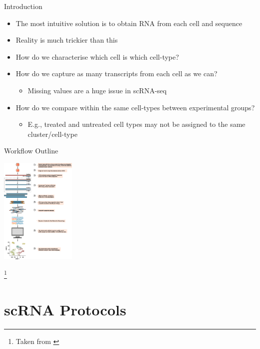 \documentclass[aspectratio=169,11pt]{beamer}
\newcommand\blfootnote[1]{%
  \begingroup
  \renewcommand\thefootnote{}\footnote{#1}%
  \addtocounter{footnote}{-1}%
  \endgroup
}
\begin{document}
\begin{frame}{Introduction}

	\begin{itemize}
		\item The most intuitive solution is to obtain RNA from each cell and sequence
		\item Reality is much trickier than this
		\pause
		\item How do we characterise which cell is which cell-type?
		\item How do we capture as many transcripts from each cell as we can?
		\begin{itemize}
			\item Missing values are a huge issue in scRNA-seq
		\end{itemize}
		\item How do we compare within the same cell-types between experimental groups?
		\begin{itemize}
			\item E.g., treated and untreated cell types may not be assigned to the same cluster/cell-type
		\end{itemize}
	\end{itemize}

\end{frame}


\begin{frame}{Workflow Outline}

	\begin{center}
	\includegraphics[width=0.27\textwidth]{figures/scRNAWorkflow.png} 
	\end{center}
	
	\blfootnote{Taken from \cite{pmid28821273}}

\end{frame}

\section{scRNA Protocols}
\end{document}
